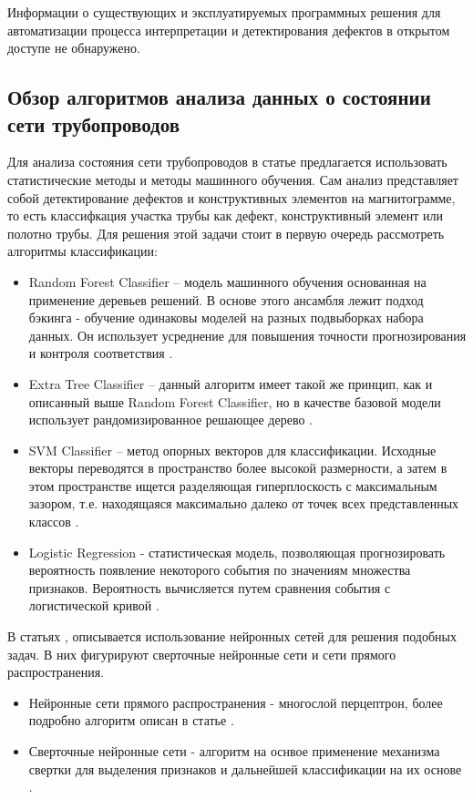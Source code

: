 \documentclass[a4paper,article,14pt]{extarticle}
\begin{document}
Информации о существующих и эксплуатируемых программных решения для автоматизации процесса интерпретации и детектирования дефектов в открытом доступе не обнаружено.

\subsection{Обзор алгоритмов анализа данных о состоянии сети трубопроводов}

Для анализа состояния сети трубопроводов в статье \cite{a2} предлагается использовать 
статистические методы и методы машинного обучения. Сам анализ представляет собой детектирование дефектов и 
конструктивных элементов на магнитограмме, то есть классифкация участка трубы как дефект, конструктивный 
элемент или полотно трубы. Для решения этой задачи стоит в первую очередь рассмотреть алгоритмы классификации:

\begin{itemize}
    \item Random Forest Classifier – модель машинного обучения основанная на применение деревьев решений. В основе этого ансамбля лежит подход бэкинга - обучение одинаковы моделей на разных подвыборках набора данных. Он использует усреднение для повышения точности прогнозирования и контроля соответствия \cite{a3}.
    \item Extra Tree Classifier – данный алгоритм имеет такой же принцип, как и описанный выше Random Forest Classifier, но в качестве базовой модели использует рандомизированное решающее дерево \cite{a4}. 
    \item SVM Classifier – метод опорных векторов для классификации. Исходные векторы переводятся в пространство более высокой размерности, а затем в этом пространстве ищется разделяющая гиперплоскость с максимальным зазором, т.е. находящаяся максимально далеко от точек всех представленных классов \cite{a5}. 
    \item Logistic Regression - статистическая модель, позволяющая прогнозировать вероятность появление некоторого события по значениям множества признаков. Вероятность вычисляется путем сравнения события с логистической кривой \cite{a6}.
\end{itemize}

В статьях  \cite{a7}, \cite{a8} описывается использование нейронных сетей для решения подобных задач. В них фигурируют сверточные нейронные сети и сети прямого распространения.

\begin{itemize}
    \item Нейронные сети прямого распространения - многослой перцептрон, более подробно алгоритм описан в статье \cite{a9}.
    \item Сверточные нейронные сети - алгоритм на оснвое применение механизма свертки для выделения 
    признаков и дальнейшей классификации на их основе \cite{a10}.
\end{itemize}
\end{document}

